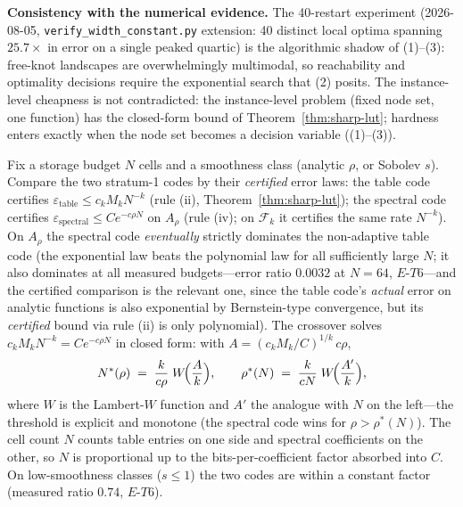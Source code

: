 \vspace{2pt}
\noindent\textbf{Consistency with the numerical evidence.}
The 40-restart experiment (2026-08-05,
\texttt{verify\_width\_constant.py} extension: 40 distinct local
optima spanning $25.7\times$ in error on a single peaked quartic) is
the algorithmic shadow of (1)--(3): free-knot landscapes are
overwhelmingly multimodal, so reachability and optimality decisions
require the exponential search that (2) posits. The instance-level
cheapness is not contradicted: the instance-level problem
(fixed node set, one function) has the closed-form bound of
Theorem~\ref{thm:sharp-lut}; hardness enters exactly when the node
set becomes a decision variable ((1)--(3)).

\vspace{4pt}
\begin{theorem}
\label{thm:capacity-decision}
Fix a storage budget $N$ cells and a smoothness class (analytic $\rho$,
or Sobolev $s$). Compare the two stratum-1 codes by their
\emph{certified} error laws: the table code certifies
$\varepsilon_{\mathrm{table}} \leq c_k M_k N^{-k}$ (rule (ii),
Theorem~\ref{thm:sharp-lut}); the spectral code certifies
$\varepsilon_{\mathrm{spectral}} \leq C e^{-c\rho N}$ on $A_\rho$
(rule (iv); on $\mathcal{F}_k$ it certifies the same rate $N^{-k}$).
On $A_\rho$ the spectral code \emph{eventually} strictly dominates the
non-adaptive table code (the exponential law beats the polynomial law
for all sufficiently large $N$; it also dominates at all measured
budgets---error ratio $0.0032$ at $N = 64$, $E$-$T6$---and the
certified comparison is the relevant one, since the table code's
\emph{actual} error on analytic functions is also exponential by
Bernstein-type convergence, but its \emph{certified} bound via rule
(ii) is only polynomial). The crossover solves
$c_k M_k N^{-k} = C e^{-c\rho N}$ in closed form: with
$A = (c_k M_k/C)^{1/k}\, c\rho$,
\begin{equation}
N^{*}(\rho) \;=\; \frac{k}{c\rho}\; W\!\Bigl(\frac{A}{k}\Bigr),
\qquad
\rho^{*}(N) \;=\; \frac{k}{cN}\; W\!\Bigl(\frac{A'}{k}\Bigr),
\label{eq:crossover-closed}
\end{equation}
where $W$ is the Lambert-$W$ function and $A'$ the analogue with $N$
on the left---the threshold is explicit and monotone (the spectral code
wins for $\rho > \rho^{*}(N)$). The cell count $N$ counts table entries
on one side and spectral coefficients on the other, so $N$ is
proportional up to the bits-per-coefficient factor absorbed into $C$.
On low-smoothness
classes ($s \leq 1$) the two codes are within a constant factor
(measured ratio $0.74$, $E$-$T6$).
\end{theorem}

